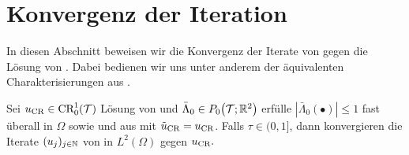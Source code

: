 \section{Konvergenz der Iteration}
In diesen Abschnitt beweisen wir die Konvergenz der Iterate von
 gegen die Lösung von
. 
Dabei bedienen wir uns unter anderem der äquivalenten Charakterisierungen aus
.

\begin{theorem}
  Sei $u_\textup{CR}\in \textup{CR}^1_0(\mathcal{T})$ Lösung von  und
  $\bar\Lambda_0\in P_0\!\left(\mathcal{T};\mathbb{R}^2\right)$ erfülle
  $\left|\bar\Lambda_0(\bullet)\right|\leq 1$ fast überall in $\Omega$ sowie
   und
   aus
   mit
  $\tilde{u}_{\textup{CR}}=u_\textup{CR}$.
  Falls $\tau \in (0, 1]$, dann konvergieren die Iterate $(u_j)_{j\in\mathbb{N}}$ von
   in $L^2(\Omega)$ gegen $u_\textup{CR}.$
\end{theorem}

